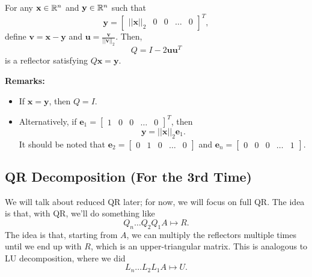 \documentclass[letterpaper]{article}
\newcommand{\0}{\mathbf{0}}
\newcommand{\y}{\mathbf{y}}
\newcommand{\x}{\mathbf{x}}
\newcommand{\e}{\mathbf{e}}
\newcommand{\vv}{\mathbf{v}}
\renewcommand{\u}{\mathbf{u}}
\begin{document}
\begin{lemma}{}{}
    For any $\x \in \R^n$ and $\y \in \R^n$ such that \[\y = \begin{bmatrix}
        ||\x||_2 & 0 & 0 & \hdots & 0
    \end{bmatrix}^T,\]
    define $\vv = \x - \y$ and $\u = \frac{\vv}{||\vv||_2}$. Then, 
    \[Q = I - 2\u\u^T\] is a reflector satisfying $Q\x = \y$. 
\end{lemma}
\textbf{Remarks:} 
\begin{itemize}
    \item If $\x = \y$, then $Q = I$.
    \item Alternatively, if $\e_1 = \begin{bmatrix}
        1 & 0 & 0 & \hdots & 0
    \end{bmatrix}^T$, then 
    \[\y = ||\x||_2 \e_1.\] It should be noted that $\e_2 = \begin{bmatrix}
        0 & 1 & 0 & \hdots & 0
    \end{bmatrix}$ and $\e_n = \begin{bmatrix}
        0 & 0 & 0 & \hdots & 1
    \end{bmatrix}$. 
\end{itemize} 

\subsection{QR Decomposition (For the 3rd Time)}
We will talk about reduced QR later; for now, we will focus on full QR. The idea is that, with QR, we'll do something like 
\[Q_n \hdots Q_2 Q_1 A \mapsto R.\]
The idea is that, starting from $A$, we can multiply the reflectors multiple times until we end up with $R$, which is an upper-triangular matrix. This is analogous to LU decomposition, where we did 
\[L_n \hdots L_2 L_1 A \mapsto U.\]
\end{document}
